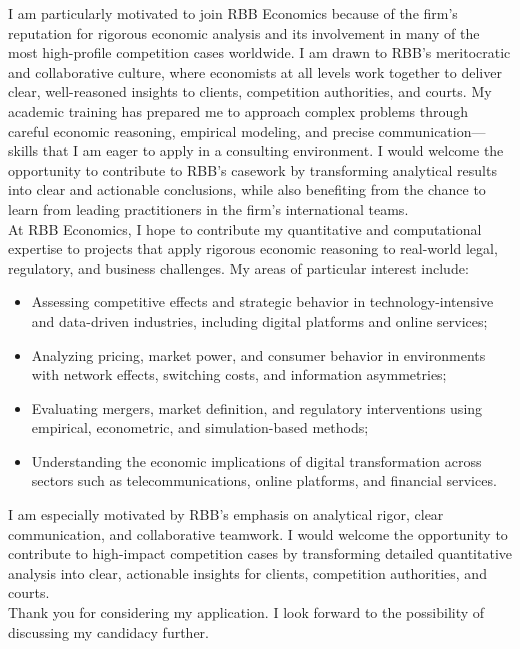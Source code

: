\documentclass{nfr}
\begin{document}
I am particularly motivated to join RBB Economics because of the firm’s reputation for rigorous economic analysis and its involvement in many of the most high-profile competition cases worldwide. 
I am drawn to RBB’s meritocratic and collaborative culture, where economists at all levels work together to deliver clear, well-reasoned insights to clients, competition authorities, and courts. 
My academic training has prepared me to approach complex problems through careful economic reasoning, empirical modeling, and precise communication—skills that I am eager to apply in a consulting environment. 
I would welcome the opportunity to contribute to RBB’s casework by transforming analytical results into clear and actionable conclusions, while also benefiting from the chance to learn from leading practitioners in the firm’s international teams.\\

At RBB Economics, I hope to contribute my quantitative and computational expertise to projects that apply rigorous economic reasoning to real-world legal, regulatory, and business challenges. 
My areas of particular interest include:
\begin{itemize}
    \item Assessing competitive effects and strategic behavior in technology-intensive and data-driven industries, including digital platforms and online services;
    \item Analyzing pricing, market power, and consumer behavior in environments with network effects, switching costs, and information asymmetries;
    \item Evaluating mergers, market definition, and regulatory interventions using empirical, econometric, and simulation-based methods;
    \item Understanding the economic implications of digital transformation across sectors such as telecommunications, online platforms, and financial services.
\end{itemize}

I am especially motivated by RBB’s emphasis on analytical rigor, clear communication, and collaborative teamwork. 
I would welcome the opportunity to contribute to high-impact competition cases by transforming detailed quantitative analysis into clear, actionable insights for clients, competition authorities, and courts.\\[0.2cm]

Thank you for considering my application. I look forward to the possibility of discussing my candidacy further.\\
\vspace{10mm}
\end{document}
